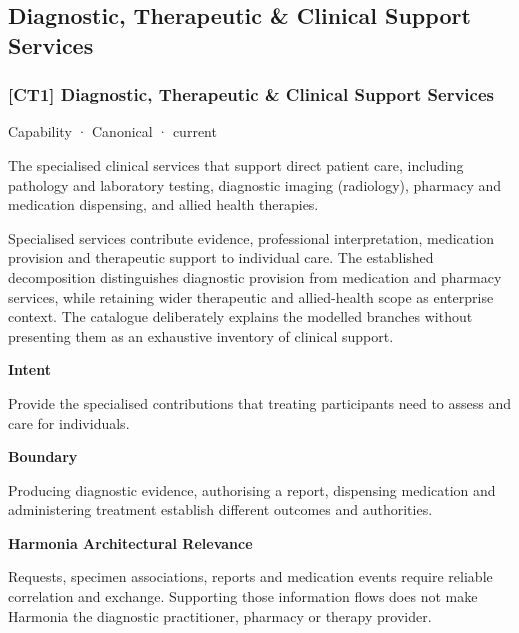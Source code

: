 \subsection{Diagnostic, Therapeutic \& Clinical Support Services}

\subsubsection{[CT1] Diagnostic, Therapeutic \& Clinical Support Services}

\label{element:4d98c3503a9f4890a677f09b0c3b6f82}
{\small Capability · Canonical · current}\par

The specialised clinical services that support direct patient care, including pathology and laboratory testing, diagnostic imaging (radiology), pharmacy and medication dispensing, and allied health therapies.



Specialised services contribute evidence, professional interpretation, medication provision and therapeutic support to individual care. The established decomposition distinguishes diagnostic provision from medication and pharmacy services, while retaining wider therapeutic and allied-health scope as enterprise context. The catalogue deliberately explains the modelled branches without presenting them as an exhaustive inventory of clinical support.



\textbf{Intent}



Provide the specialised contributions that treating participants need to assess and care for individuals.



\textbf{Boundary}



Producing diagnostic evidence, authorising a report, dispensing medication and administering treatment establish different outcomes and authorities.



\textbf{Harmonia Architectural Relevance}



Requests, specimen associations, reports and medication events require reliable correlation and exchange. Supporting those information flows does not make Harmonia the diagnostic practitioner, pharmacy or therapy provider.



